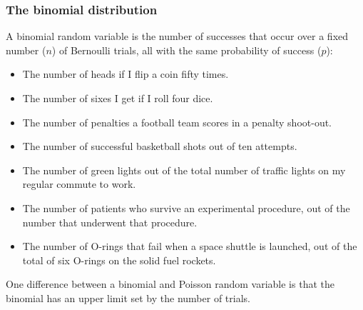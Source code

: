 \documentclass{beamer}\usepackage[]{graphicx}\usepackage[]{xcolor}
\begin{document}



\begin{frame}
\frametitle{The binomial distribution}

A binomial random variable is the number of successes that occur over a fixed number ($n$) of Bernoulli trials, all with the same probability of success ($p$):
\begin{itemize}
\item The number of heads if I flip a coin fifty times.
\item The number of sixes I get if I roll four dice.
\item The number of penalties a football team scores in a penalty shoot-out.
\item The number of successful basketball shots out of ten attempts.
\item The number of green lights out of the total number of traffic lights
on my regular commute to work.
\item The number of patients who survive an experimental procedure, 
out of the number that underwent that procedure.
\item The number of O-rings that fail when a space shuttle is launched, 
out of the total of six O-rings on the solid fuel rockets.
\end{itemize}

\bigskip

One difference between a binomial and Poisson random variable is that the binomial has an upper limit set by the number of trials.

\end{frame}
\end{document}
